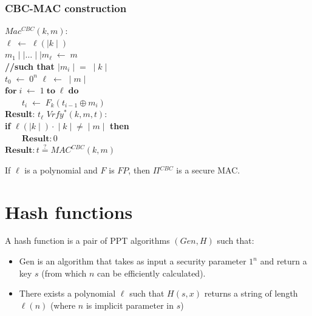 \documentclass[../main]{subfiles}
\begin{document}
\subsubsection{CBC-MAC construction}
$Mac^{CBC}(k, m)$:\\
$\ell{} \; \leftarrow{} \; \ell{}(\mid{} k \mid)$\\
$m_1 \mid\mid{} \ldots{} \mid\mid{} m_{\ell} \; \leftarrow{} \; m$\\
\textbf{//such that $\mid{} m_i \mid{} = \; \mid{}k\mid{}$}\\
$t_0 \; \leftarrow{} \; 0^n$
$\ell{} \; \leftarrow{} \; \mid{} m \mid{}$\\
$\textbf{for} \; i \; \leftarrow{} \; 1 \; \textbf{to} \; \ell{} \; \textbf{do}$\\
$\quad{}\quad{} t_i \; \leftarrow{} \; F_k(t_{i-1} \oplus{} m_i)$\\
\textbf{Result}: $t_{\ell}$
\newline
\newline
$Vrfy^{*}(k, m, t)$:\\
\textbf{if} $\ell{}(\mid k \mid) \cdot{} \mid{} k \mid{} \neq{} \mid{} m \mid{}$ \textbf{then}\\
$\quad{}\quad{} \textbf{Result}: 0$\\
$\textbf{Result}: t \stackrel{?}{=} MAC^{CBC}(k, m)$\\

\begin{theorem}
    If $\ell{}$ is a polynomial and $F$ is $FP$, then $\Pi{}^{CBC}$ is a secure MAC.
\end{theorem}
\section{Hash functions}
\begin{definition}
    A hash function is a pair of PPT algorithms $(Gen, H)$ such that:
    \begin{itemize}
        \item Gen is an algorithm that takes as input a security parameter $1^n$ and return a key $s$ (from which $n$ can be efficiently calculated).
        \item There exists a polynomial $\ell{}$ such that $H(s, x)$ returns a string of length $\ell{}(n)$ (where $n$ is implicit parameter in $s$)
    \end{itemize}
\end{definition}
\end{document}
